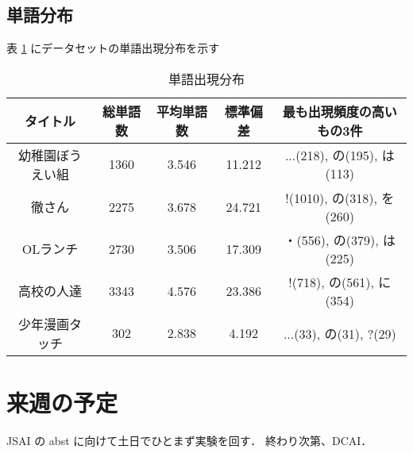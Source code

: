 \documentclass[onecolumn]{ujarticle}   %
\begin{document}
	\subsection{単語分布}
	表 \ref{tab:word_count} にデータセットの単語出現分布を示す
	\begin{table}[h]
		\vspace{-3mm}
		\centering
		\caption{単語出現分布}
		\label{tab:word_count}
		\begin{tabular}{|c|c|c|c|c|} \hline
			タイトル&総単語数&平均単語数&標準偏差&最も出現頻度の高いもの3件\\ \hline\hline
			幼稚園ぼうえい組&1360&3.546&11.212&...(218), の(195), は(113)\\ \hline
			徹さん&2275&3.678&24.721&!(1010), の(318), を(260)\\ \hline
			OLランチ&2730&3.506&17.309&・(556), の(379), は(225)\\ \hline
			高校の人達&3343&4.576&23.386&!(718), の(561), に(354)\\ \hline
			少年漫画タッチ&302&2.838&4.192&...(33), の(31), ?(29)\\ \hline
		\end{tabular}
	\end{table}

	\section{来週の予定}\noindent
	JSAI の abst に向けて土日でひとまず実験を回す．
	終わり次第、DCAI．
\end{document}
